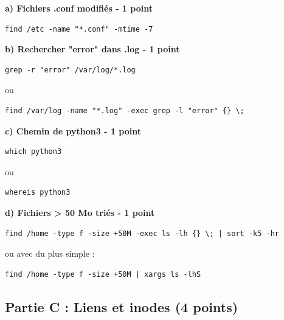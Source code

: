 \documentclass[12pt,a4paper]{article}
\begin{document}
\begin{answerbox}
\textbf{a) Fichiers .conf modifiés - 1 point}
\begin{lstlisting}
find /etc -name "*.conf" -mtime -7
\end{lstlisting}

\textbf{b) Rechercher "error" dans .log - 1 point}
\begin{lstlisting}
grep -r "error" /var/log/*.log
\end{lstlisting}

ou

\begin{lstlisting}
find /var/log -name "*.log" -exec grep -l "error" {} \;
\end{lstlisting}

\textbf{c) Chemin de python3 - 1 point}
\begin{lstlisting}
which python3
\end{lstlisting}

ou

\begin{lstlisting}
whereis python3
\end{lstlisting}

\textbf{d) Fichiers > 50 Mo triés - 1 point}
\begin{lstlisting}
find /home -type f -size +50M -exec ls -lh {} \; | sort -k5 -hr
\end{lstlisting}

ou avec du plus simple :

\begin{lstlisting}
find /home -type f -size +50M | xargs ls -lhS
\end{lstlisting}
\end{answerbox}

\subsection*{Partie C : Liens et inodes (4 points)}
\end{document}
